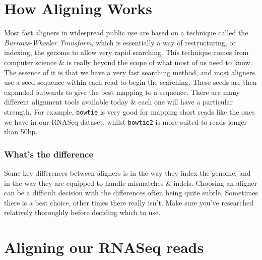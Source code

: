 \section{How Aligning Works}
\begin{note}
Most fast aligners in widespread public use are based on a technique called the \textit{Burrows-Wheeler Transform}, which is essentially a way of restructuring, or indexing, the genome to allow very rapid searching.
This technique comes from computer science \& is really beyond the scope of what most of us need to know.
The essence of it is that we have a very fast searching method, and most aligners use a seed sequence within each read to begin the searching.
These seeds are then expanded outwards to give the best mapping to a sequence.
There are many different alignment tools available today \& each one will have a particular strength.
For example, \texttt{bowtie} is very good for mapping short reads like the ones we have in our RNASeq dataset, whilst \texttt{bowtie2} is more suited to reads longer than 50bp.
\end{note}

\subsubsection{What's the difference}
Some key differences between aligners is in the way they index the genome, and in the way they are equipped to handle mismatches \& indels.
Choosing an aligner can be a difficult decision with the differences often being quite subtle.
Sometimes there is a best choice, other times there really isn't.
Make sure you've researched relatively thoroughly before deciding which to use.

\section{Aligning our RNASeq reads}
